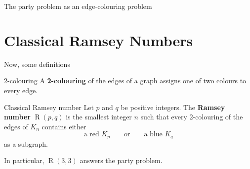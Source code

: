 \documentclass[aspectratio=169,11pt]{beamer}
\newcommand{\Ram}{\operatorname{R}}
\begin{document}
\begin{frame}{The party problem as an edge-colouring problem}
\begin{center}
\end{center}
\end{frame}

\section{Classical Ramsey Numbers}

\begin{frame}{Now, some definitions}
\large

\begin{block}{2-colouring}
  A \textbf{2-colouring} of the edges of a graph assigns one of two colours
  to every edge.
\end{block}

\vspace{0.35cm}

\begin{alertblock}{Classical Ramsey number}
  Let $p$ and $q$ be positive integers. The \textbf{Ramsey number}
  $\Ram(p,q)$ is the smallest integer $n$ such that every 2-colouring of the
  edges of $K_n$ contains either
  \[
    \text{a red }K_p
    \qquad\text{or}\qquad
    \text{a blue }K_q
  \]
  as a subgraph.
\end{alertblock}

\vspace{0.35cm}

\begin{center}
  In particular, $\Ram(3,3)$ answers the party problem.
\end{center}
\end{frame}
\end{document}
